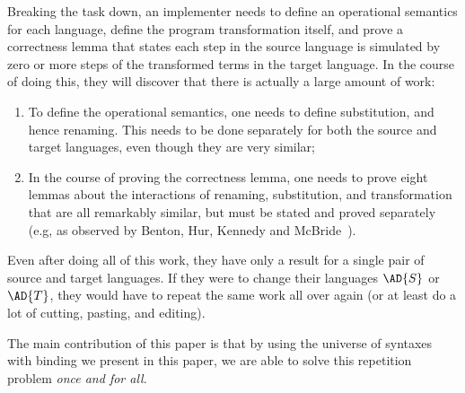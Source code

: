 Breaking the task down, an implementer needs to define an operational
semantics for each language, define the program transformation itself,
and prove a correctness lemma that states each step in the source
language is simulated by zero or more steps of the transformed terms
in the target language. In the course of doing this, they will
discover that there is actually a large amount of work:

\begin{enumerate}
\item To define the operational semantics, one needs to define
  substitution, and hence renaming. This needs to be done separately
  for both the source and target languages, even though they are very
  similar;
\item In the course of proving the correctness lemma, one needs to
  prove eight lemmas about the interactions of renaming, substitution,
  and transformation that are all remarkably similar, but must be
  stated and proved separately (e.g, as observed by Benton, Hur, Kennedy
  and McBride~\citeyear{benton2012strongly}).
\end{enumerate}

Even after doing all of this work, they have only a result for a single
pair of source and target languages. If they were to change their
languages $\AD{S}$ or $\AD{T}$, they would have to repeat the same work
all over again (or at least do a lot of cutting, pasting, and
editing).

The main contribution of this paper is that by using the universe of
syntaxes with binding we present in this paper, we are able to solve
this repetition problem \emph{once and for all}.


